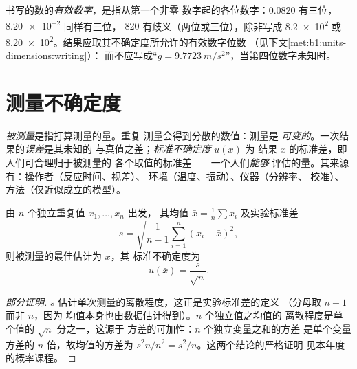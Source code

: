 \begin{definition}[有效数字]\label{def:b1:units-dimensions:sigfig}
书写的数的\emph{有效数字}，是指从第一个非零
数字起的各位数字：$0.0820$ 有三位，$\num{8.20e-2}$ 同样有三位，
$820$ 有歧义（两位或三位），除非写成 \num{8.2e2} 或
\num{8.20e2}。结果应取其不确定度所允许的有效数字位数
（见下文\cref{met:b1:units-dimensions:writing}）：
而不应写成“$g = \qty{9.7723}{m/s^2}$”，当第四位数字未知时。
\end{definition}

\section{测量不确定度}

\begin{definition}\label{def:b1:units-dimensions:uncertainty}
\emph{被测量}是指打算测量的量。重复
测量会得到分散的数值：测量是
\emph{可变的}。一次结果的\emph{误差}是其未知的
与真值之差；\emph{标准不确定度} $u(x)$ 为
结果 $x$ 的标准差，即人们可合理归于被测量的
各个取值的标准差——一个人们\emph{能够}
评估的量。其来源有：操作者（反应时间、视差）、
环境（温度、振动）、仪器（分辨率、
校准）、方法（仅近似成立的模型）。
\end{definition}

\begin{proposition}[A 类评定]\label{prop:b1:units-dimensions:typeA}
由 $n$ 个独立重复值 $x_1, \dots, x_n$ 出发，
其均值 $\bar x = \frac1n \sum x_i$ 及实验标准差
\[
s = \sqrt{\frac{1}{n-1}\sum_{i=1}^n (x_i - \bar x)^2},
\]
则被测量的最佳估计为 $\bar x$，其
标准不确定度为
\[
u(\bar x) = \frac{s}{\sqrt n} .
\]
\end{proposition}

\begin{proof}[部分证明]
$s$ 估计单次测量的离散程度，这正是实验标准差的定义
（分母取 $n - 1$ 而非 $n$，因为
均值本身也由数据估计得到）。$n$ 个独立值之均值的
离散程度是单个值的 $\sqrt n$ 分之一，这源于
方差的可加性：$n$ 个独立变量之和的方差
是单个变量方差的 $n$ 倍，故均值的方差为
$s^2 n / n^2 = s^2/n$。这两个结论的严格证明
见本年度的概率课程。
\end{proof}

